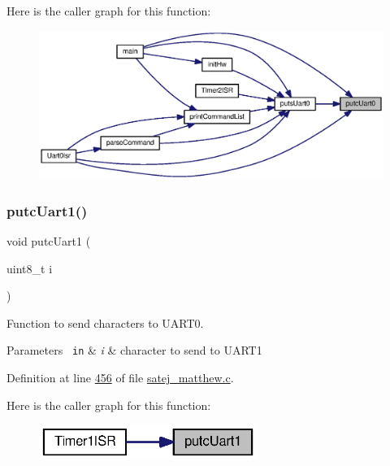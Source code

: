 Here is the caller graph for this function\+:
\nopagebreak
\begin{figure}[H]
\begin{center}
\leavevmode
\includegraphics[width=350pt]{satej__matthew_8c_a27ebab6950bfb65d641dd04feb03906f_icgraph}
\end{center}
\end{figure}
\mbox{\label{satej__matthew_8c_a6c61bcdd147e256a7e6b05b34fb783bc}} 
\subsubsection{\texorpdfstring{putcUart1()}{putcUart1()}}
{\footnotesize\ttfamily void putc\+Uart1 (\begin{DoxyParamCaption}\item[{uint8\+\_\+t}]{i }\end{DoxyParamCaption})}



Function to send characters to U\+A\+R\+T0. 


\begin{DoxyParams}[1]{Parameters}
\mbox{\texttt{ in}}  & {\em i} & character to send to U\+A\+R\+T1 \\
\hline
\end{DoxyParams}


Definition at line \mbox{\hyperlink{satej__matthew_8c_source_l00456}{456}} of file \mbox{\hyperlink{satej__matthew_8c_source}{satej\+\_\+matthew.\+c}}.

Here is the caller graph for this function\+:
\nopagebreak
\begin{figure}[H]
\begin{center}
\leavevmode
\includegraphics[width=201pt]{satej__matthew_8c_a6c61bcdd147e256a7e6b05b34fb783bc_icgraph}
\end{center}
\end{figure}
\mbox{\label{satej__matthew_8c_af4adb618930ee1a928705aec083cf726}} 
